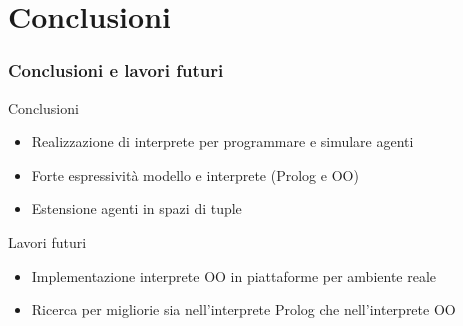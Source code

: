 \documentclass[handout]{beamer}\mode<presentation>{\usetheme{AMSCesenaBleu}}
\begin{document}
\section{Conclusioni}
\begin{frame}
\frametitle{Conclusioni e lavori futuri}
\begin{block}{Conclusioni}
\begin{itemize}
\item Realizzazione di interprete per programmare e simulare agenti
\item Forte espressività modello e interprete (Prolog e OO)
\item Estensione agenti in spazi di tuple 
\end{itemize}
\end{block}
\begin{block}{Lavori futuri}
\begin{itemize}
\item Implementazione interprete OO in piattaforme per ambiente reale
\item Ricerca per migliorie sia nell'interprete Prolog che nell'interprete OO
\end{itemize}
\end{block}
\end{frame}

\section{}
\subsection{}
\maketitle
\end{document}
